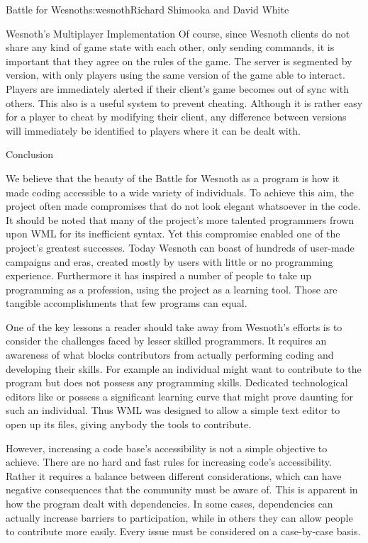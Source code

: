 \begin{aosachapter}{Battle for Wesnoth}{s:wesnoth}{Richard Shimooka and David White}
\begin{aosasect1}{Wesnoth's Multiplayer Implementation}
Of course, since Wesnoth clients do not share any kind of game state
with each other, only sending commands, it is important that they
agree on the rules of the game. The server is segmented by version,
with only players using the same version of the game able to
interact. Players are immediately alerted if their client's game
becomes out of sync with others. This also is a useful system to
prevent cheating. Although it is rather easy for a player to cheat by
modifying their client, any difference between versions will
immediately be identified to players where it can be dealt with.

\end{aosasect1}

\begin{aosasect1}{Conclusion}

We believe that the beauty of the Battle for Wesnoth as a program is
how it made coding accessible to a wide variety of individuals. To
achieve this aim, the project often made compromises that do not look
elegant whatsoever in the code. It should be noted that many of the
project's more talented programmers frown upon WML for its inefficient
syntax. Yet this compromise enabled one of the project's greatest
successes. Today Wesnoth can boast of hundreds of user-made campaigns
and eras, created mostly by users with little or no programming
experience. Furthermore it has inspired a number of people to take up
programming as a profession, using the project as a learning
tool. Those are tangible accomplishments that few programs can equal.

One of the key lessons a reader should take away from Wesnoth's
efforts is to consider the challenges faced by lesser skilled
programmers. It requires an awareness of what blocks contributors from
actually performing coding and developing their skills. For example an
individual might want to contribute to the program but does not
possess any programming skills. Dedicated technological editors like
 or  possess a significant learning curve that
might prove daunting for such an individual. Thus WML was designed to
allow a simple text editor to open up its files, giving anybody the
tools to contribute.

However, increasing a code base's accessibility is not a simple
objective to achieve. There are no hard and fast rules for increasing
code's accessibility. Rather it requires a balance between different
considerations, which can have negative consequences that the
community must be aware of. This is apparent in how the program dealt
with dependencies. In some cases, dependencies can actually increase
barriers to participation, while in others they can allow people to
contribute more easily. Every issue must be considered on a
case-by-case basis.


\end{aosasect1}
\end{aosachapter}
